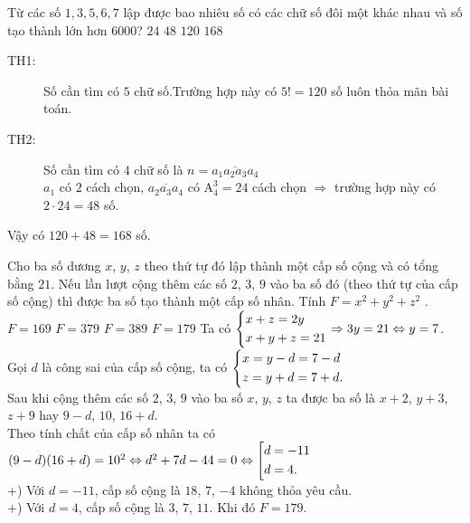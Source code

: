 \begin{ex}%
 Từ các số $1,3,5,6,7$ lập được bao nhiêu số có các chữ số đôi một khác nhau và số tạo thành lớn hơn $6000$?
 \choice
  {$24$}
  {$48$}
  {$120$}
  {\True $168$}
 \loigiai
  {
  \begin{description}
   \item[TH1:] Số cần tìm có $5$ chữ số.Trường hợp này có $5!=120$ số luôn thỏa mãn bài toán.
   \item[TH2:] Số cần tìm có $4$ chữ số là $n=\overline{a_1a_2a_3a_4}$\\
   $a_1$ có $2$ cách chọn, $\overline{a_2a_3a_4}$ có $\mathrm{A}_4^3=24$ cách chọn $\Rightarrow $ trường hợp này có $2\cdot 24 = 48$ số.
  \end{description}
  Vậy có $120 + 48=168$ số.
  }
\end{ex}


\begin{ex}%
 Cho ba số dương $x$, $y$, $z$ theo thứ tự đó lập thành một cấp số cộng và có tổng bằng $21$. Nếu lần lượt cộng thêm các số $2$, $3$, $9$ vào ba số đó (theo thứ tự của cấp số cộng) thì được ba số tạo thành một cấp số nhân. Tính $F=x^2+y^2+z^2$ .
 \choice
  {$F=169$}
  {$F=379$}
  {$F=389$}
  {\True $F=179$}
 \loigiai
  {
  Ta có $\left\{\begin{aligned}&x+z=2y\\& x+y+z=21\end{aligned}\right. \Rightarrow 3y=21\Leftrightarrow y = 7$.\\
  Gọi $d$ là công sai của cấp số cộng, ta có $\left\{\begin{aligned}&x=y-d=7-d \\ &z=y+d = 7+d.\end{aligned}\right.$\\
  Sau khi cộng thêm các số $2$, $3$, $9$ vào ba số $x$, $y$, $z$ ta được ba số là $x+2$, $y+3$, $z+9$ hay $9-d$, $10$, $16+d$.\\
  Theo tính chất của cấp số nhân ta có $(9-d)(16+d) = 10^2 \Leftrightarrow d^2+7d-44=0 \Leftrightarrow \left[\begin{aligned}&d=-11\\ &d=4.\end{aligned}\right. $\\
  +) Với $d=-11$, cấp số cộng là $18$, $7$, $-4$ không thỏa yêu cầu. \\
  +) Với $d=4$, cấp số cộng là $3$, $7$, $11$. Khi đó $F=179$.
  }
\end{ex}



